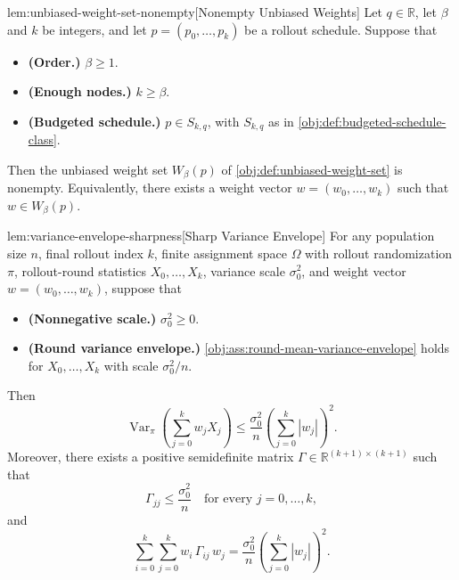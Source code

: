 \begin{lemmav}{lem:unbiased-weight-set-nonempty}[Nonempty Unbiased Weights]
Let \(q\in\mathbb R\), let \(\beta\) and \(k\) be integers, and let \(p=(p_0,\ldots,p_k)\) be a rollout schedule. Suppose that
\begin{itemize}
\item \textbf{(Order.)} \(\beta\ge 1\).
\item \textbf{(Enough nodes.)} \(k\ge \beta\).
\item \textbf{(Budgeted schedule.)} \(p\in S_{k,q}\), with \(S_{k,q}\) as in \cref{obj:def:budgeted-schedule-class}.
\end{itemize}
Then the unbiased weight set \(W_\beta(p)\) of \cref{obj:def:unbiased-weight-set} is nonempty. Equivalently, there exists a weight vector \(w=(w_0,\ldots,w_k)\) such that \(w\in W_\beta(p)\).
\end{lemmav}

\begin{lemmav}{lem:variance-envelope-sharpness}[Sharp Variance Envelope]
For any population size $n$, final rollout index $k$, finite assignment space $\Omega$ with rollout randomization $\pi$, rollout-round statistics $X_0,\ldots,X_k$, variance scale $\sigma_0^2$, and weight vector $w=(w_0,\ldots,w_k)$, suppose that
\begin{itemize}
\item \textbf{(Nonnegative scale.)} $\sigma_0^2\ge 0$.
\item \textbf{(Round variance envelope.)} \cref{obj:ass:round-mean-variance-envelope} holds for $X_0,\ldots,X_k$ with scale $\sigma_0^2/n$.
\end{itemize}
Then
\[
\operatorname{Var}_\pi\!\left(\sum_{j=0}^k w_j X_j\right)
\le
\frac{\sigma_0^2}{n}\left(\sum_{j=0}^k |w_j|\right)^2 .
\]
Moreover, there exists a positive semidefinite matrix
$\Gamma\in\mathbb R^{(k+1)\times(k+1)}$ such that
\[
\Gamma_{jj}\le \frac{\sigma_0^2}{n}\quad\text{for every }j=0,\ldots,k,
\]
and
\[
\sum_{i=0}^k\sum_{j=0}^k w_i\,\Gamma_{ij}\,w_j
=
\frac{\sigma_0^2}{n}\left(\sum_{j=0}^k |w_j|\right)^2 .
\]
\end{lemmav}

